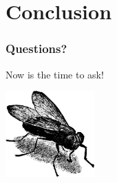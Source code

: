 \documentclass{beamer}
\begin{document}
\section{Conclusion}

\begin{frame}
  \frametitle{Questions?}

\begin{center}
  Now is the time to ask!
  \vfill

  \includegraphics[height=9em]{fly.png}
\end{center}
\end{frame}
\end{document}
